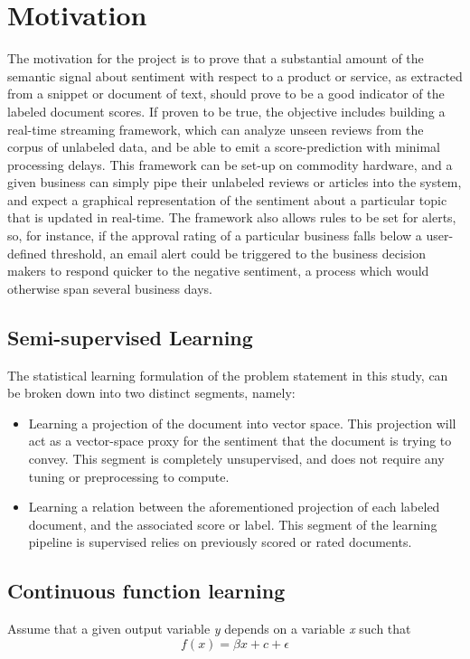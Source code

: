 \documentclass[conference]{IEEEtran}
\begin{document}
\vspace{5mm}

\section{Motivation}
    The motivation for the project is to prove that a substantial amount of the semantic signal about sentiment with respect to a product or service, as extracted from a snippet or document of text, should prove to be a good indicator of the labeled document scores. 
    If proven to be true, the objective includes building a real-time streaming framework, which can analyze unseen reviews from the corpus of unlabeled data, and be able to emit a score-prediction with minimal processing delays.
    This framework can be set-up on commodity hardware, and a given business can simply pipe their unlabeled reviews or articles into the system, and expect a graphical representation of the sentiment about a particular topic that is updated in real-time. 
    The framework also allows rules to be set for alerts, so, for instance, if the approval rating of a particular business falls below a user-defined threshold, an email alert could be triggered to the business decision makers to respond quicker to the negative sentiment, a process which would otherwise span several business days.

    \subsection{Semi-supervised Learning}
        The statistical learning formulation of the problem statement in this study, can be broken down into two distinct segments, namely:
        \begin{itemize}
            \item Learning a projection of the document into vector space. This projection will act as a vector-space proxy for the sentiment that the document is trying to convey. This segment is completely unsupervised, and does not require any tuning or preprocessing to compute.
            \item Learning a relation between the aforementioned projection of each labeled document, and the associated score or label. This segment of the learning pipeline is supervised relies on previously scored or rated documents.
        \end{itemize}

    \subsection{Continuous function learning}
        Assume that a given output variable \textit{y} depends on a variable \textit{x} such that
        \begin{equation}
            \displaystyle f(x) = \beta x + c + \epsilon
        \end{equation}
\end{document}
